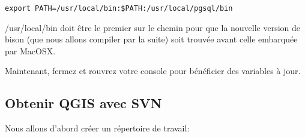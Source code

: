 \begin{verbatim}
export PATH=/usr/local/bin:$PATH:/usr/local/pgsql/bin 
\end{verbatim}

/usr/local/bin doit \^etre le premier sur le chemin pour que la nouvelle version de bison (que nous allons compiler par la suite) soit trouv\'ee avant celle embarqu\'ee par MacOSX.

Maintenant, fermez et rouvrez votre console pour b\'en\'eficier des variables \`a jour.

% 
% 
% 
% 
% 
% 
% 
% 
% 
% 
% 

\subsection{Obtenir QGIS avec SVN}
Nous allons d'abord cr\'eer un r\'epertoire de travail:

